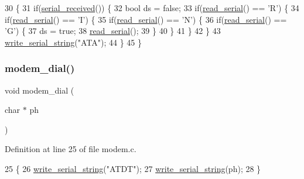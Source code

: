 \begin{DoxyCode}
30                      \{
31     \textcolor{keywordflow}{if}(\hyperlink{a00050_af10f0e64ba89e8635aa7245ca08297c5_af10f0e64ba89e8635aa7245ca08297c5}{serial\_received}()) \{
32         \textcolor{keywordtype}{bool} ds = \textcolor{keyword}{false};
33         \textcolor{keywordflow}{if}(\hyperlink{a00050_ad343a7018f74662f794968dfa0523841_ad343a7018f74662f794968dfa0523841}{read\_serial}() == \textcolor{charliteral}{'R'}) \{
34             \textcolor{keywordflow}{if}(\hyperlink{a00050_ad343a7018f74662f794968dfa0523841_ad343a7018f74662f794968dfa0523841}{read\_serial}() == \textcolor{charliteral}{'I'}) \{
35                 \textcolor{keywordflow}{if}(\hyperlink{a00050_ad343a7018f74662f794968dfa0523841_ad343a7018f74662f794968dfa0523841}{read\_serial}() == \textcolor{charliteral}{'N'}) \{
36                     \textcolor{keywordflow}{if}(\hyperlink{a00050_ad343a7018f74662f794968dfa0523841_ad343a7018f74662f794968dfa0523841}{read\_serial}() == \textcolor{charliteral}{'G'}) \{
37                         ds = \textcolor{keyword}{true};
38                         \hyperlink{a00050_ad343a7018f74662f794968dfa0523841_ad343a7018f74662f794968dfa0523841}{read\_serial}();
39                     \}
40                 \}
41             \}
42         \}
43         \hyperlink{a00050_aabbe45d6670f606c53ba38a5fb14b650_aabbe45d6670f606c53ba38a5fb14b650}{write\_serial\_string}(\textcolor{stringliteral}{"ATA"});
44     \}
45 \}
\end{DoxyCode}
\mbox{\label{a00041_ab1123a026be8f7d0ece72e2813222da0_ab1123a026be8f7d0ece72e2813222da0}} 
\subsubsection{\texorpdfstring{modem\+\_\+dial()}{modem\_dial()}}
{\footnotesize\ttfamily void modem\+\_\+dial (\begin{DoxyParamCaption}\item[{char $\ast$}]{ph }\end{DoxyParamCaption})}



Definition at line 25 of file modem.\+c.


\begin{DoxyCode}
25                           \{
26     \hyperlink{a00050_aabbe45d6670f606c53ba38a5fb14b650_aabbe45d6670f606c53ba38a5fb14b650}{write\_serial\_string}(\textcolor{stringliteral}{"ATDT"});
27     \hyperlink{a00050_aabbe45d6670f606c53ba38a5fb14b650_aabbe45d6670f606c53ba38a5fb14b650}{write\_serial\_string}(ph);
28 \}
\end{DoxyCode}
\mbox{\label{a00041_adf147e13a3c0b23148f4eb1db184f68d_adf147e13a3c0b23148f4eb1db184f68d}} 
